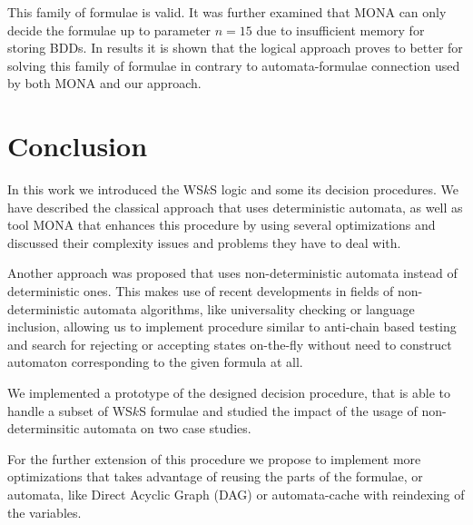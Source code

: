 This family of formulae is valid. It was further examined that \textsc{MONA} can
only decide the formulae up to parameter $n = 15$ due to insufficient memory for
storing BDDs. In results it is shown that the logical approach \cite{mso} proves
to better for solving this family of formulae in contrary to automata-formulae
connection used by both \textsc{MONA} and our approach.

\chapter{Conclusion}\label{summary}

In this work we introduced the WS$k$S logic and some its decision procedures. We
have described the classical approach that uses deterministic automata, as well
as tool \textsc{MONA} that enhances this procedure by using several optimizations and
discussed their complexity issues and problems they have to deal with.

Another approach was proposed that uses non-deterministic automata instead of
deterministic ones. This makes use of recent developments in fields of
non-deterministic automata algorithms, like universality checking or language
inclusion, allowing us to implement procedure similar to anti-chain based
testing \cite{tacas} and search for rejecting or accepting states on-the-fly
without need to construct automaton corresponding to the given formula at all.

We implemented a prototype of the designed decision procedure, that is able to
handle a subset of WS$k$S formulae and studied the impact of the usage of
non-determinsitic automata on two case studies.

For the further extension of this procedure we propose to implement more
optimizations that takes advantage of reusing the parts of the formulae, or
automata, like Direct Acyclic Graph (DAG) or automata-cache with reindexing of
the variables.

